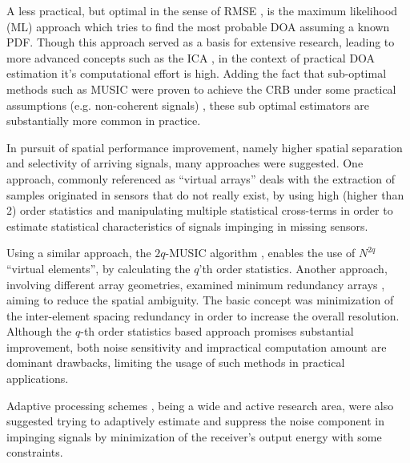 \par A less practical, but optimal in the sense of RMSE \cite{krim1996two}, is the maximum likelihood (ML) approach which tries to find the most probable DOA assuming a known PDF.
Though this approach served as a basis for extensive research, leading to more advanced concepts such as the ICA \cite{hyvarinen1999survey}, in the context of practical DOA estimation it's computational effort is high.
Adding the fact that sub-optimal methods such as MUSIC were proven to achieve the CRB under some practical assumptions (e.g. non-coherent signals) \cite{stoica1989music}, these sub optimal estimators are substantially more common in practice. 
\par In pursuit of spatial performance improvement, namely higher spatial separation and selectivity of arriving signals, many approaches were suggested.  
One approach, commonly referenced as ``virtual arrays'' \cite{pal2010nested,chevalier2005virtual,dogan1995applications} deals with the extraction of samples originated in sensors that do not really exist, by using high (higher than 2) order statistics and manipulating multiple statistical cross-terms in order to estimate statistical characteristics of signals impinging in missing sensors.
\par Using a similar approach, the $2q$-MUSIC algorithm \cite{chevalier2006high}, enables the use of $N^{2q}$ ``virtual elements'', by calculating the $q$'th order statistics.
Another approach, involving different array geometries, examined minimum redundancy arrays \cite{moffet1968minimum,pillai1985new,pillai1987statistical,Kupershtein2013}, aiming to reduce the spatial ambiguity. The basic concept was minimization of the inter-element spacing redundancy in order to increase the overall resolution.
Although the $q$-th order statistics based approach promises substantial improvement, both noise sensitivity and impractical computation amount are dominant drawbacks, limiting the usage of such methods in practical applications.   
\par Adaptive processing schemes \cite{frost1972algorithm,manolakis2000statistical}, being a wide and active research area, were also suggested trying to adaptively estimate and suppress the noise component in impinging signals by minimization of the receiver's output energy with some constraints.
